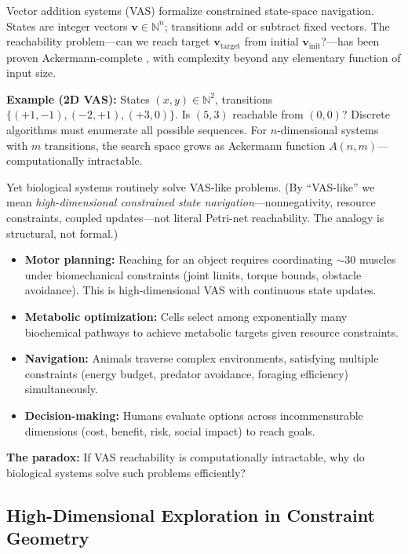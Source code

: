 \documentclass[12pt]{article}
\begin{document}
Vector addition systems (VAS) formalize constrained state-space navigation. States are integer vectors $\mathbf{v} \in \mathbb{N}^n$; transitions add or subtract fixed vectors. The reachability problem---can we reach target $\mathbf{v}_{\text{target}}$ from initial $\mathbf{v}_{\text{init}}$?---has been proven Ackermann-complete \cite{czerwinski2021,brubaker2023}, with complexity beyond any elementary function of input size.

\textbf{Example (2D VAS):} States $(x,y) \in \mathbb{N}^2$, transitions $\{(+1,-1), (-2,+1), (+3,0)\}$. Is $(5,3)$ reachable from $(0,0)$? Discrete algorithms must enumerate all possible sequences. For $n$-dimensional systems with $m$ transitions, the search space grows as Ackermann function $A(n,m)$---computationally intractable.

Yet biological systems routinely solve VAS-like problems. (By ``VAS-like'' we mean \textit{high-dimensional constrained state navigation}---nonnegativity, resource constraints, coupled updates---not literal Petri-net reachability. The analogy is structural, not formal.)
\begin{itemize}
\item \textbf{Motor planning:} Reaching for an object requires coordinating $\sim 30$ muscles under biomechanical constraints (joint limits, torque bounds, obstacle avoidance). This is high-dimensional VAS with continuous state updates.
\item \textbf{Metabolic optimization:} Cells select among exponentially many biochemical pathways to achieve metabolic targets given resource constraints.
\item \textbf{Navigation:} Animals traverse complex environments, satisfying multiple constraints (energy budget, predator avoidance, foraging efficiency) simultaneously.
\item \textbf{Decision-making:} Humans evaluate options across incommensurable dimensions (cost, benefit, risk, social impact) to reach goals.
\end{itemize}

\textbf{The paradox:} If VAS reachability is computationally intractable, why do biological systems solve such problems efficiently?

\subsection{High-Dimensional Exploration in Constraint Geometry}
\end{document}
